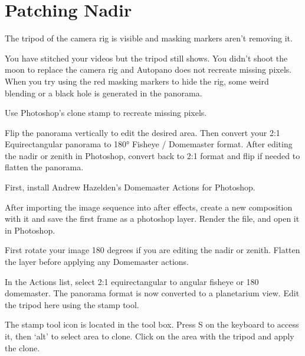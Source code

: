 \chapter{Patching Nadir}
\pagecolor{white}
\label{chap:48}
\begin{fullwidth}

\problem

{\large The tripod of the camera rig is visible and masking markers aren’t removing it. \par}

You have stitched your videos but the tripod still shows. You didn't shoot the moon to replace the camera rig and Autopano does not recreate missing pixels. When you try using the red masking markers to hide the rig, some weird blending or a black hole is generated in the panorama.

\solution

{\large Use Photoshop’s clone stamp to recreate missing pixels. \par}

Flip the panorama vertically to edit the desired area. Then convert your 2:1 Equirectangular panorama to 180° Fisheye / Domemaster format. After editing the nadir or zenith in Photoshop, convert back to 2:1 format and flip if needed to flatten the panorama.

First, install Andrew Hazelden's Domemaster Actions for Photoshop.

\clearpage

After importing the image sequence into after effects, create a new composition with it and save the first frame as a photoshop layer. Render the file, and open it in Photoshop.


First rotate your image 180 degrees if you are editing the nadir or zenith. Flatten the layer before applying any Domemaster actions.


In the Actions list, select 2:1 equirectangular to angular fisheye or 180 domemaster. The panorama format is now converted  to a planetarium view. Edit the tripod here using the stamp tool.

\tip The stamp tool icon is located in the tool box. Press S on the keyboard to access it, then ‘alt’ to select area to clone. Click on the area with the tripod and apply the clone.



\end{fullwidth}
